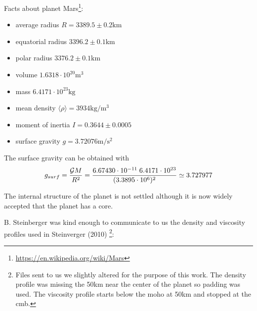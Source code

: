 

Facts about planet Mars\footnote{\url{https://en.wikipedia.org/wiki/Mars}}:
\begin{itemize}
\item average radius $R=3389.5 \pm 0.2 \si{\km}$
\item equatorial radius $3396.2 \pm 0.1 \si{\km}$
\item polar radius $3376.2 \pm 0.1 \si{\km}$
\item volume $1.6318 \cdot 10^{20} \si{\cubic\metre}$
\item mass $6.4171 \cdot 10^{23}\si{\kilo\gram}$
\item mean density $\langle\rho\rangle= 3934\si{\kilo\gram\per\cubic\meter}$
\item moment of inertia $I=0.3644 \pm 0.0005$
\item surface gravity $g=3.72076 \si{\metre\per\square\second}$
\end{itemize}

The surface gravity can be obtained with 
\[
g_{surf}=\frac{{\cal G} M}{R^2} 
=\frac{6.67430 \cdot 10^{-11} \; 6.4171 \cdot 10^{23} }{(3.3895\cdot 10^6)^2}
\simeq 3.727977
\]

The internal structure of the planet is not settled although 
it is now widely accepted that the planet has a core. 

B. Steinberger was kind enough to communicate to us the density and viscosity 
profiles used in Steinverger \etal (2010) \cite{stwt10} \footnote{Files sent to us 
we slightly altered for the purpose of this work. The density profile was missing 
the 50km near the center of the planet so padding was used. The viscosity profile 
starts below the moho at 50\si{\km} and stopped at the cmb. }:

